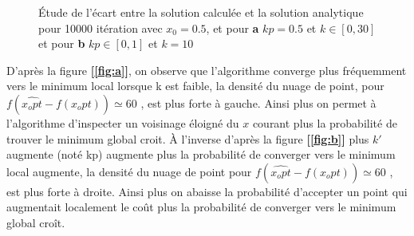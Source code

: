 \documentclass[12pt]{article}
\begin{document}
\begin{figure}[H]
  \centering
  \caption{Étude de l'écart entre la solution calculée et la solution analytique pour 10000 itération avec $x_0 = 0.5$, et pour \textbf{a} $kp=0.5$ et $k\in [0,30]$ et  pour \textbf{b} $kp \in [0,1]$ et $k= 10$}
  \label{fig:ab}
\end{figure}
D'après la figure \textbf{[\ref{fig:a}]}, on observe que l'algorithme converge plus fréquemment vers le minimum local lorsque k est faible, la densité du nuage de point, pour $f(\hat{x_opt}- f(x_opt)) \simeq 60$ , est plus forte à gauche. Ainsi plus on permet à l'algorithme d'inspecter un voisinage éloigné du $x$ courant plus  la probabilité de trouver le minimum global croit.  À l'inverse d'après la figure \textbf{[\ref{fig:b}]} plus $k'$ augmente (noté kp) augmente plus la probabilité de converger vers le minimum local augmente, la densité du nuage de point pour  $f(\hat{x_opt}- f(x_opt)) \simeq 60$ , est plus forte à droite. Ainsi plus on abaisse la probabilité d'accepter un point qui augmentait localement le coût plus la probabilité de converger vers le minimum global croît.
\end{document}
